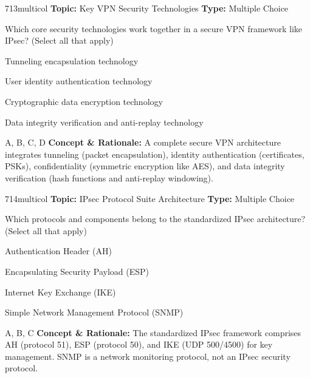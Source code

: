 \begin{qcard}{713}{multicol}
\textcolor{darkslate!75}{\small\textbf{Topic:} Key VPN Security Technologies \hfill \textbf{Type:} Multiple Choice}\vspace{0.4em}\par
Which core security technologies work together in a secure VPN framework like IPsec? (Select all that apply)
\begin{qoptions}
\item Tunneling encapsulation technology
\item User identity authentication technology
\item Cryptographic data encryption technology
\item Data integrity verification and anti-replay technology
\end{qoptions}
\end{qcard}
\nopagebreak
\begin{explainbox}{A, B, C, D}
\textbf{Concept \& Rationale:} A complete secure VPN architecture integrates tunneling (packet encapsulation), identity authentication (certificates, PSKs), confidentiality (symmetric encryption like AES), and data integrity verification (hash functions and anti-replay windowing).
\end{explainbox}

\begin{qcard}{714}{multicol}
\textcolor{darkslate!75}{\small\textbf{Topic:} IPsec Protocol Suite Architecture \hfill \textbf{Type:} Multiple Choice}\vspace{0.4em}\par
Which protocols and components belong to the standardized IPsec architecture? (Select all that apply)
\begin{qoptions}
\item Authentication Header (AH)
\item Encapsulating Security Payload (ESP)
\item Internet Key Exchange (IKE)
\item Simple Network Management Protocol (SNMP)
\end{qoptions}
\end{qcard}
\nopagebreak
\begin{explainbox}{A, B, C}
\textbf{Concept \& Rationale:} The standardized IPsec framework comprises AH (protocol 51), ESP (protocol 50), and IKE (UDP 500/4500) for key management. SNMP is a network monitoring protocol, not an IPsec security protocol.
\end{explainbox}

